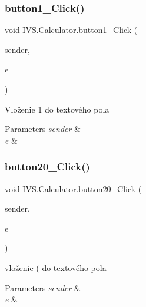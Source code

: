 \subsubsection{\texorpdfstring{button1\+\_\+\+Click()}{button1\_Click()}}
{\footnotesize\ttfamily void I\+V\+S.\+Calculator.\+button1\+\_\+\+Click (\begin{DoxyParamCaption}\item[{object}]{sender,  }\item[{Event\+Args}]{e }\end{DoxyParamCaption})\hspace{0.3cm}{\ttfamily [protected]}}



Vloženie \textquotesingle{}1\textquotesingle{} do textového pola 


\begin{DoxyParams}{Parameters}
{\em sender} & \\
\hline
{\em e} & \\
\hline
\end{DoxyParams}
\mbox{\label{class_i_v_s_1_1_calculator_abb0b26c38b19fed222be5905a63db4fa}} 
\subsubsection{\texorpdfstring{button20\+\_\+\+Click()}{button20\_Click()}}
{\footnotesize\ttfamily void I\+V\+S.\+Calculator.\+button20\+\_\+\+Click (\begin{DoxyParamCaption}\item[{object}]{sender,  }\item[{Event\+Args}]{e }\end{DoxyParamCaption})\hspace{0.3cm}{\ttfamily [protected]}}



vloženie \textquotesingle{}(\textquotesingle{} do textového pola 


\begin{DoxyParams}{Parameters}
{\em sender} & \\
\hline
{\em e} & \\
\hline
\end{DoxyParams}
\mbox{\label{class_i_v_s_1_1_calculator_a33dc653a738421ce3fe770c4c470a224}} 
